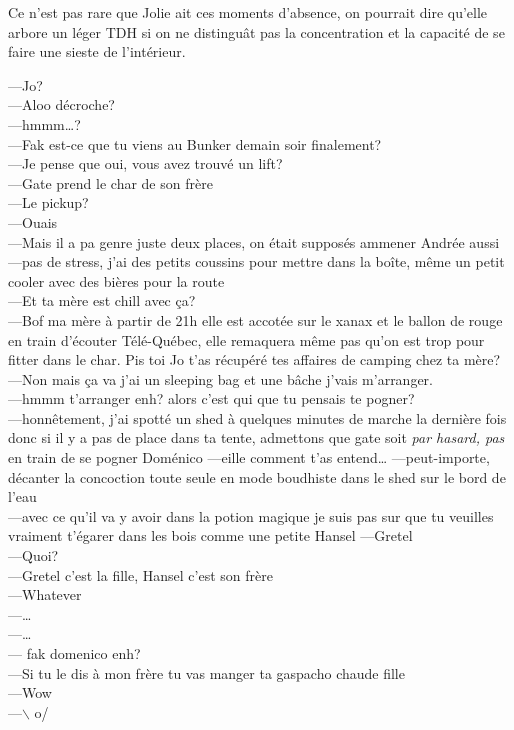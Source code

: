\documentclass{article}
\begin{document}
Ce n'est pas rare que Jolie ait ces moments d'absence, on pourrait dire qu'elle
arbore un léger TDH si on ne distinguât pas la concentration et la capacité
de se faire une sieste de l'intérieur.

---Jo?\\
---Aloo décroche?\\
---hmmm\ldots?\\
---Fak est-ce que tu viens au Bunker demain soir finalement?\\
---Je pense que oui, vous avez trouvé un lift?\\
---Gate prend le char de son frère\\
---Le pickup?\\
---Ouais\\
---Mais il a pa genre juste deux places, on était supposés ammener
Andrée aussi\\
---pas de stress, j'ai des petits coussins pour mettre dans la boîte, même
un petit cooler avec des bières pour la route\\
---Et ta mère est chill avec ça?\\
---Bof ma mère à partir de 21h elle est accotée sur le xanax et le ballon de
  rouge en train d'écouter Télé-Québec, elle remaquera même pas qu'on est
trop pour fitter dans le char. Pis toi Jo t'as récupéré tes affaires de camping
chez ta mère?\\
---Non mais ça va j'ai un sleeping bag et une bâche j'vais m'arranger.\\
---hmmm t'arranger enh? alors c'est qui que tu pensais te pogner?\\
---honnêtement, j'ai spotté un shed à quelques minutes de marche
la dernière fois donc si il y a pas de place dans ta tente,
admettons que gate soit \textit{par hasard, pas} en train
de se pogner Doménico
---eille comment t'as entend\ldots
---peut-importe,  décanter la concoction toute seule en mode boudhiste dans le shed sur le bord de l'eau\\
---avec ce qu'il va y avoir dans la potion magique je suis pas sur
que tu veuilles vraiment t'égarer dans les bois comme une petite
Hansel
---Gretel\\
---Quoi?\\
---Gretel c'est la fille, Hansel c'est son frère\\
---Whatever\\
---\ldots\\
---\ldots\\
--- fak domenico enh?\\
---Si tu le dis à mon frère tu vas manger ta gaspacho chaude fille\\
---Wow\\
---$\backslash$  o/
\clearpage
\end{document}
